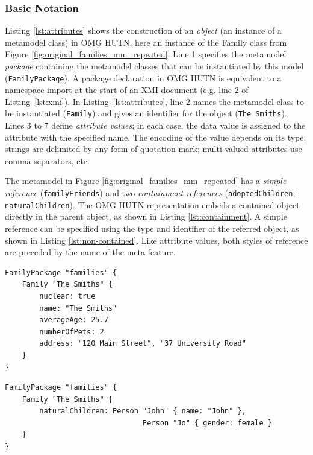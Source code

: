 \subsubsection{Basic Notation}
Listing \ref{lst:attributes} shows the construction of an \emph{object} (an instance of a metamodel class) in OMG HUTN, here an instance of the Family class from Figure \ref{fig:original_families_mm_repeated}. Line 1 specifies the metamodel \emph{package} containing the metamodel classes that can be instantiated by this model (\texttt{Fa\-mi\-lyPa\-ck\-a\-ge}). A package declaration in OMG HUTN is equivalent to a namespace import at the start of an XMI document (e.g. line 2 of Listing~\ref{lst:xmi}). In Listing~\ref{lst:attributes}, line 2 names the metamodel class to be instantiated (\texttt{Fa\-mi\-ly}) and gives an identifier for the object (\texttt{The Sm\-it\-hs}). Lines 3 to 7 define \emph{attribute values}; in each case, the data value is assigned to the attribute with the specified name. The encoding of the value depends on its type: strings are delimited by any form of quotation mark; multi-valued attributes use comma separators, etc.

The metamodel in Figure \ref{fig:original_families_mm_repeated} has a \emph{simple reference} (\texttt{fa\-mi\-lyFr\-ie\-n\-ds}) and two \emph{containment references} (\texttt{ad\-op\-t\-edCh\-il\-dr\-en}; \texttt{na\-tu\-r\-alCh\-il\-dr\-en}). The OMG HUTN representation embeds a contained object directly in the parent object, as shown in Listing \ref{lst:containment}. A simple reference can be specified using the type and identifier of the referred object, as shown in Listing \ref{lst:non-contained}. Like attribute values, both styles of reference are preceded by the name of the meta-feature.

\begin{lstlisting}[caption={[Specifying attributes with HUTN]Specifying attributes with HUTN, taken from \cite{rose08hutn}}, label=lst:attributes, language=HutnFamilies]
FamilyPackage "families" {
    Family "The Smiths" {
        nuclear: true
        name: "The Smiths"
        averageAge: 25.7
        numberOfPets: 2
        address: "120 Main Street", "37 University Road"
    }
}
\end{lstlisting}

\begin{lstlisting}[caption={[Specifying a containment reference with HUTN]Specifying a containment reference with HUTN, taken from \cite{rose08hutn}}, label=lst:containment, language=HutnFamilies]
FamilyPackage "families" {
    Family "The Smiths" {
        naturalChildren: Person "John" { name: "John" },
                                Person "Jo" { gender: female }
    }
}
\end{lstlisting}


